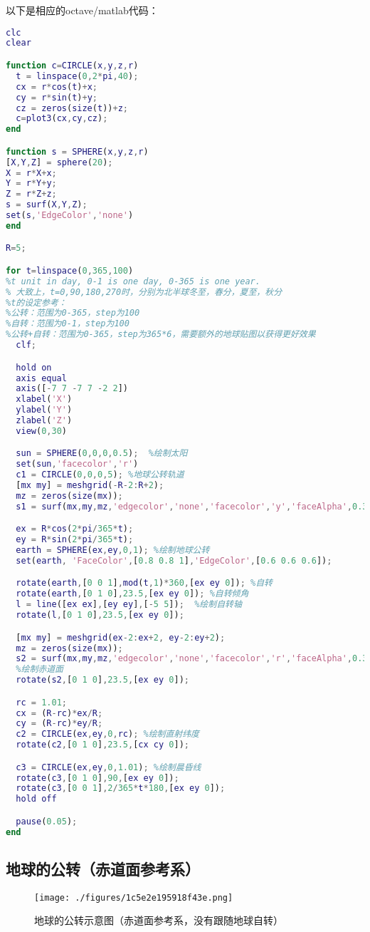 以下是相应的octave/matlab代码：
\begin{lstlisting}[language=matlab]
clc
clear

function c=CIRCLE(x,y,z,r)
  t = linspace(0,2*pi,40);
  cx = r*cos(t)+x;
  cy = r*sin(t)+y;
  cz = zeros(size(t))+z;
  c=plot3(cx,cy,cz);
end

function s = SPHERE(x,y,z,r)
[X,Y,Z] = sphere(20);
X = r*X+x;
Y = r*Y+y;
Z = r*Z+z;
s = surf(X,Y,Z);
set(s,'EdgeColor','none')
end

R=5;

for t=linspace(0,365,100)
%t unit in day, 0-1 is one day, 0-365 is one year.
% 大致上，t=0,90,180,270时，分别为北半球冬至，春分，夏至，秋分
%t的设定参考：
%公转：范围为0-365，step为100
%自转：范围为0-1，step为100
%公转+自转：范围为0-365，step为365*6，需要额外的地球贴图以获得更好效果
  clf;

  hold on
  axis equal
  axis([-7 7 -7 7 -2 2])
  xlabel('X')
  ylabel('Y')
  zlabel('Z')
  view(0,30)

  sun = SPHERE(0,0,0,0.5);  %绘制太阳
  set(sun,'facecolor','r')
  c1 = CIRCLE(0,0,0,5); %地球公转轨道
  [mx my] = meshgrid(-R-2:R+2);
  mz = zeros(size(mx));
  s1 = surf(mx,my,mz,'edgecolor','none','facecolor','y','faceAlpha',0.3); %黄道面

  ex = R*cos(2*pi/365*t);
  ey = R*sin(2*pi/365*t);
  earth = SPHERE(ex,ey,0,1); %绘制地球公转
  set(earth, 'FaceColor',[0.8 0.8 1],'EdgeColor',[0.6 0.6 0.6]);

  rotate(earth,[0 0 1],mod(t,1)*360,[ex ey 0]); %自转
  rotate(earth,[0 1 0],23.5,[ex ey 0]); %自转倾角
  l = line([ex ex],[ey ey],[-5 5]);  %绘制自转轴
  rotate(l,[0 1 0],23.5,[ex ey 0]);

  [mx my] = meshgrid(ex-2:ex+2, ey-2:ey+2);
  mz = zeros(size(mx));
  s2 = surf(mx,my,mz,'edgecolor','none','facecolor','r','faceAlpha',0.3);
  %绘制赤道面
  rotate(s2,[0 1 0],23.5,[ex ey 0]);

  rc = 1.01;
  cx = (R-rc)*ex/R;
  cy = (R-rc)*ey/R;
  c2 = CIRCLE(ex,ey,0,rc); %绘制直射纬度
  rotate(c2,[0 1 0],23.5,[cx cy 0]);

  c3 = CIRCLE(ex,ey,0,1.01); %绘制晨昏线
  rotate(c3,[0 1 0],90,[ex ey 0]);
  rotate(c3,[0 0 1],2/365*t*180,[ex ey 0]);
  hold off

  pause(0.05);
end
\end{lstlisting}

\subsection{地球的公转（赤道面参考系）}
\begin{figure}[ht]
\centering
\texttt{[image: ./figures/1c5e2e195918f43e.png]}
\caption{地球的公转示意图（赤道面参考系，没有跟随地球自转）} \label{fig_georev_2}
\end{figure}

